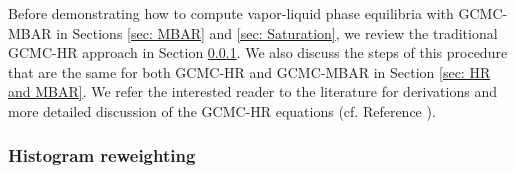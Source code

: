 \documentclass[journal=jced,manuscript=article]{achemso}
\begin{document}
Before demonstrating how to compute vapor-liquid phase equilibria with GCMC-MBAR in Sections \ref{sec: MBAR} and \ref{sec: Saturation}, we review the traditional GCMC-HR approach in Section \ref{sec: HR}. We also discuss the steps of this procedure that are the same for both GCMC-HR and GCMC-MBAR in Section \ref{sec: HR and MBAR}. We refer the interested reader to the literature for derivations and more detailed discussion of the GCMC-HR equations (cf. Reference ).


\subsubsection{Histogram reweighting} \label{sec: HR}
\end{document}
